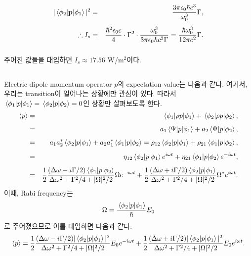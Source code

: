 \documentclass[10pt, a4paper]{article}
\numberwithin{equation}{section}
\begin{document}
    \subsubsection{}
    \begin{eqnarray}
        |\mel{\phi_2}{\mathbf{p}}{\phi_1}|^2 &=& \dfrac{3\pi \epsilon_0 \hbar c^3}{\omega_0^3}\Gamma,\\[1ex]
        \therefore I_s &=& \dfrac{\hbar^2 \epsilon_0 c}{4}\cdot \Gamma^2 \cdot \dfrac{\omega_0^3}{3\pi \epsilon_0 \hbar c^3 \Gamma} = \dfrac{\hbar \omega_0^3}{12\pi c^2}\Gamma.
    \end{eqnarray}

    \subsubsection{}
    주어진 값들을 대입하면 $I_s \approx 17.56$ W/m$^2$이다.

    \subsection{}
    Electric dipole momentum operator $p$의 expectation value는 다음과 같다. 여기서, 우리는 transition이 일어나는 상황에만 관심이 있다. 따라서
    $\mel{\phi_1}{p}{\phi_1} = \mel{\phi_2}{p}{\phi_2} = 0$인 상황만 살펴보도록 한다.
    \begin{eqnarray}
        \expval{p} &=& \mel{\phi_1}{\rho p}{\phi_1} + \mel{\phi_2}{\rho p}{\phi_2},\\[1ex]
        &=& a_1 \mel{\Psi}{p}{\phi_1} + a_2 \mel{\Psi}{p}{\phi_2},\\[1ex]
        &=& a_1 a_2^* \mel{\phi_2}{p}{\phi_1} + a_2a_1^* \mel{\phi_1}{p}{\phi_2} = \rho_{12}\mel{\phi_2}{p}{\phi_1} + \rho_{21}\mel{\phi_1}{p}{\phi_2},\\[1ex]
        &=& \eta_{12}\mel{\phi_2}{p}{\phi_1}e^{i\omega t} + \eta_{21}\mel{\phi_1}{p}{\phi_2}e^{-i\omega t},\\[1ex]
        &=& \dfrac{1}{2}\dfrac{(\Delta \omega - i\Gamma/2)\mel{\phi_1}{p}{\phi_2}}{\Delta\omega^2 + \Gamma^2/4 + |\Omega|^2/2} \Omega e^{-i\omega t} + \dfrac{1}{2}\dfrac{(\Delta\omega + i\Gamma/2)\mel{\phi_2}{p}{\phi_1}}{\Delta\omega^2 + \Gamma^2/4 + |\Omega|^2/2}\Omega^* e^{i\omega t}.
    \end{eqnarray}
    이때, Rabi frequency는
    \begin{equation}
        \Omega = \dfrac{\mel{\phi_2}{p}{\phi_1}}{\hbar}E_0
    \end{equation}
    로 주어졌으므로 이를 대입하면 다음과 같다.
    \begin{equation}
        \expval{p} = \dfrac{1}{2}\dfrac{(\Delta\omega - i\Gamma/2)|\mel{\phi_2}{p}{\phi_1}|^2}{\Delta\omega^2 + \Gamma^2/4 + |\Omega|^2/2}E_0 e^{-i\omega t} + \dfrac{1}{2}\dfrac{(\Delta\omega + i\Gamma/2)|\mel{\phi_2}{p}{\phi_1}|^2}{\Delta\omega^2 + \Gamma^2/4 + |\Omega|^2/2}E_0 e^{i\omega t}.
    \end{equation}
    
\end{document}
